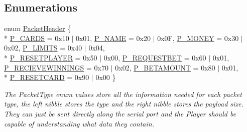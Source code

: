 \subsection*{Enumerations}
\begin{DoxyCompactItemize}
\item 
enum \hyperlink{namespaceComms_a2c437ccb25ec06a8a5b10960c31b7246}{Packet\-Header} \{ \\*
\hyperlink{namespaceComms_a2c437ccb25ec06a8a5b10960c31b7246add58fa1f1478570d3eadbcf0971657e3}{P\-\_\-\-C\-A\-R\-D\-S} = 0x10 $\vert$ 0x01, 
\hyperlink{namespaceComms_a2c437ccb25ec06a8a5b10960c31b7246a2906edd04bd6403dbc11ed6fde335163}{P\-\_\-\-N\-A\-M\-E} = 0x20 $\vert$ 0x0\-F, 
\hyperlink{namespaceComms_a2c437ccb25ec06a8a5b10960c31b7246aa32646badac9e48c28b0bc346f2accf7}{P\-\_\-\-M\-O\-N\-E\-Y} = 0x30 $\vert$ 0x02, 
\hyperlink{namespaceComms_a2c437ccb25ec06a8a5b10960c31b7246aa54b779d4d6301190ad850c6be56a1e2}{P\-\_\-\-L\-I\-M\-I\-T\-S} = 0x40 $\vert$ 0x04, 
\\*
\hyperlink{namespaceComms_a2c437ccb25ec06a8a5b10960c31b7246a1cacc7a34b8d25f0d613dac5d56bbcfb}{P\-\_\-\-R\-E\-S\-E\-T\-P\-L\-A\-Y\-E\-R} = 0x50 $\vert$ 0x00, 
\hyperlink{namespaceComms_a2c437ccb25ec06a8a5b10960c31b7246a03009ce4e9078e238b8a5443a02edbd2}{P\-\_\-\-R\-E\-Q\-U\-E\-S\-T\-B\-E\-T} = 0x60 $\vert$ 0x01, 
\hyperlink{namespaceComms_a2c437ccb25ec06a8a5b10960c31b7246a6cc2be410adb6ff1a221428f9b1f8754}{P\-\_\-\-R\-E\-C\-I\-E\-V\-E\-W\-I\-N\-N\-I\-N\-G\-S} = 0x70 $\vert$ 0x02, 
\hyperlink{namespaceComms_a2c437ccb25ec06a8a5b10960c31b7246a5032f14e699e1725c9fa0d2b5e1213fc}{P\-\_\-\-B\-E\-T\-A\-M\-O\-U\-N\-T} = 0x80 $\vert$ 0x01, 
\\*
\hyperlink{namespaceComms_a2c437ccb25ec06a8a5b10960c31b7246ac6f5cfbe40a9f647dbb91ecda768f782}{P\-\_\-\-R\-E\-S\-E\-T\-C\-A\-R\-D} = 0x90 $\vert$ 0x00
 \}
\begin{DoxyCompactList}\small\item\em The Packet\-Type enum values store all the information needed for each packet type, the left nibble stores the type and the right nibble stores the payload size. They can just be sent directly along the serial port and the Player should be capable of understanding what data they contain. \end{DoxyCompactList}\end{DoxyCompactItemize}
